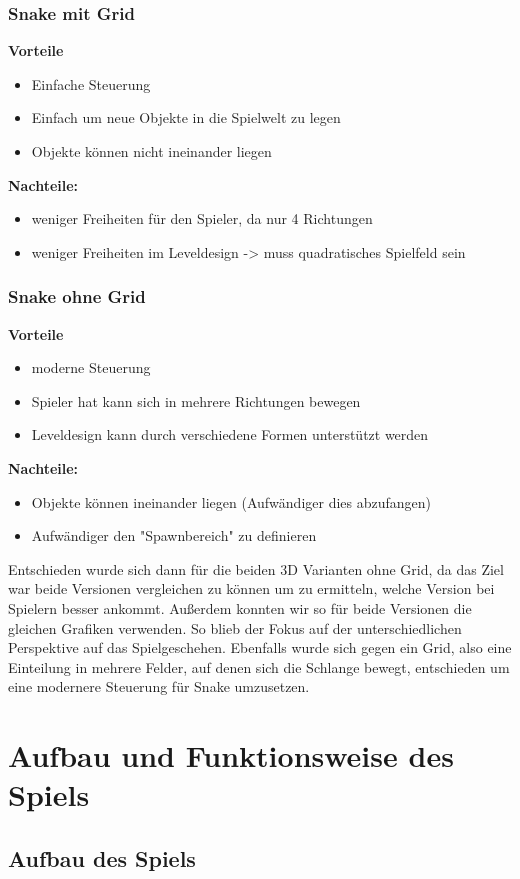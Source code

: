 \subsubsection{Snake mit Grid}
\textbf{Vorteile}
\begin{itemize}
\item Einfache Steuerung
\item Einfach um neue Objekte in die Spielwelt zu legen
\item Objekte können nicht ineinander liegen
\end{itemize}
\textbf{Nachteile:}
\begin{itemize}
\item weniger Freiheiten für den Spieler, da nur 4 Richtungen
\item weniger Freiheiten im Leveldesign -> muss quadratisches Spielfeld sein
\end{itemize}
\subsubsection{Snake ohne Grid}
\textbf{Vorteile}
\begin{itemize}
\item moderne Steuerung
\item Spieler hat kann sich in mehrere Richtungen bewegen
\item Leveldesign kann durch verschiedene Formen unterstützt werden
\end{itemize}
\textbf{Nachteile:}
\begin{itemize}
\item Objekte können ineinander liegen (Aufwändiger dies abzufangen)
\item Aufwändiger den "Spawnbereich" zu definieren
\end{itemize}

Entschieden wurde sich dann für die beiden 3D Varianten ohne Grid, da das Ziel war beide Versionen vergleichen zu können um zu ermitteln, welche Version bei Spielern besser ankommt. Außerdem konnten wir so für beide Versionen die gleichen Grafiken verwenden. So blieb der Fokus auf der unterschiedlichen Perspektive auf das Spielgeschehen. Ebenfalls wurde sich gegen ein Grid, also eine Einteilung in mehrere Felder, auf denen sich die Schlange bewegt, entschieden um eine modernere Steuerung für Snake umzusetzen.
\section{Aufbau und Funktionsweise des Spiels}
\subsection{Aufbau des Spiels}
